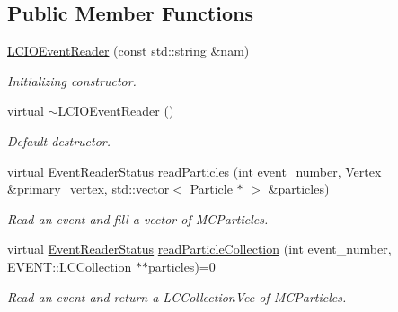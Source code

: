 \subsection*{Public Member Functions}
\begin{DoxyCompactItemize}
\item 
\hyperlink{class_d_d4hep_1_1_simulation_1_1_l_c_i_o_event_reader_ac64aa140499c254ba45518732e88c118}{LCIOEventReader} (const std::string \&nam)
\begin{DoxyCompactList}\small\item\em Initializing constructor. \item\end{DoxyCompactList}\item 
virtual \hyperlink{class_d_d4hep_1_1_simulation_1_1_l_c_i_o_event_reader_ad352960abd7fd0ff6c7e90775ba7be83}{$\sim$LCIOEventReader} ()
\begin{DoxyCompactList}\small\item\em Default destructor. \item\end{DoxyCompactList}\item 
virtual \hyperlink{class_d_d4hep_1_1_simulation_1_1_geant4_event_reader_ae4f4bc83ffcf5b0c1868ad78859851e7}{EventReaderStatus} \hyperlink{class_d_d4hep_1_1_simulation_1_1_l_c_i_o_event_reader_a76241be8cda1ad304f15f3613fca976b}{readParticles} (int event\_\-number, \hyperlink{class_d_d4hep_1_1_simulation_1_1_geant4_vertex}{Vertex} \&primary\_\-vertex, std::vector$<$ \hyperlink{class_d_d4hep_1_1_simulation_1_1_geant4_particle}{Particle} $\ast$ $>$ \&particles)
\begin{DoxyCompactList}\small\item\em Read an event and fill a vector of MCParticles. \item\end{DoxyCompactList}\item 
virtual \hyperlink{class_d_d4hep_1_1_simulation_1_1_geant4_event_reader_ae4f4bc83ffcf5b0c1868ad78859851e7}{EventReaderStatus} \hyperlink{class_d_d4hep_1_1_simulation_1_1_l_c_i_o_event_reader_a49acaafd98bbd6a954b29cfd9465d017}{readParticleCollection} (int event\_\-number, EVENT::LCCollection $\ast$$\ast$particles)=0
\begin{DoxyCompactList}\small\item\em Read an event and return a LCCollectionVec of MCParticles. \item\end{DoxyCompactList}\end{DoxyCompactItemize}


